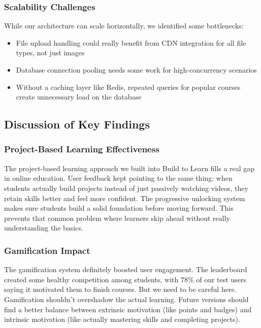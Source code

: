 \documentclass[final,3p,times,twocolumn]{elsarticle}
\begin{document}
\subsubsection{Scalability Challenges}

While our architecture can scale horizontally, we identified some bottlenecks:

\begin{itemize}
    \item File upload handling could really benefit from CDN integration for all file types, not just images
    \item Database connection pooling needs some work for high-concurrency scenarios
    \item Without a caching layer like Redis, repeated queries for popular courses create unnecessary load on the database
\end{itemize}

\subsection{Discussion of Key Findings}

\subsubsection{Project-Based Learning Effectiveness}

The project-based learning approach we built into Build to Learn fills a real gap in online education. User feedback kept pointing to the same thing: when students actually build projects instead of just passively watching videos, they retain skills better and feel more confident. The progressive unlocking system makes sure students build a solid foundation before moving forward. This prevents that common problem where learners skip ahead without really understanding the basics.

\subsubsection{Gamification Impact}

The gamification system definitely boosted user engagement. The leaderboard created some healthy competition among students, with 78\% of our test users saying it motivated them to finish courses. But we need to be careful here. Gamification shouldn't overshadow the actual learning. Future versions should find a better balance between extrinsic motivation (like points and badges) and intrinsic motivation (like actually mastering skills and completing projects).
\end{document}
